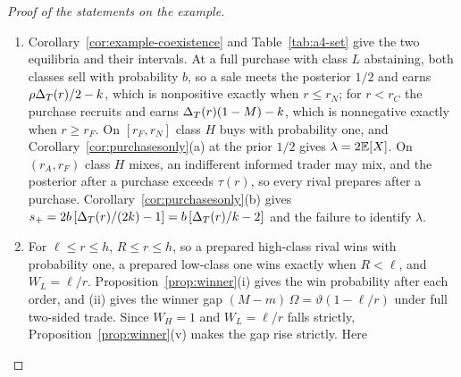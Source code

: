 \begin{proof}[Proof of the statements on the example]
\begin{enumerate}[label=(\alph*),leftmargin=2em]
recruitment at \(r_1\) is \(M'>\tau(r_1)\), and strict exclusion at \(r_2\) is \(M'<\tau(r_2)\); together they are the band.
Its left end exceeds \(3-2/v\): the inequality \(2\tau(r_1)-1>3-2/v\) is \(v<2/[4-2\tau(r_1)]=\reg{vol_band_max_frac}\),
and the example's volume lies below this bound by \(\reg{margin_vol_band_B}\). So
Proposition~\ref{prop:informedshare}(b) gives each share in the band a slot with the example's counts, and its entry
formula gives entry \(\rho+(1-\rho)v/2\) at \(r_1\) and \(\rho\) at \(r_2\), as at the example's slot, whose top
posterior lies in the band too. Such a slot has \(m'=(1-\vartheta')/2>1-\tau(r_2)\), so at \(r_1\) and at \(r_2\)
\[
\rho\,m'\,\DT(r)-k>\rho\,[1-\tau(r_2)]\,\DT(r_1)-k=\reg{margin_obs_band_incentive_B}>0,
\]
because \(\DT(r_2)>\DT(r_1)\). Proposition~\ref{prop:spread}(iv) then gives full two-sided trade as the unique outcome
of the slot at both strengths. The share \(\reg{alt_theta_B}\) lies in the band, and by
Proposition~\ref{prop:spread}(iv) its price gap at \(r_1\) is \(\rho\DT(r_1)\vartheta'+(1-\rho)\,w_{r_1}(M')\). On
\((r_S,h)\), entry after a sale and after no order is \(\rho\), and Proposition~\ref{prop:informedshare}(c) at the prior
\(1/2\) gives the share from the sale impact.
\item Corollary~\ref{cor:example-coexistence} and Table~\ref{tab:a4-set} give the two equilibria and their
intervals. At a full purchase with class \(L\) abstaining, both classes sell with probability \(b\), so a sale meets the
posterior \(1/2\) and earns \(\rho\Delta_T(r)/2-k\), which is nonpositive exactly when \(r\le r_N\); for \(r<r_C\) the purchase
recruits and earns \(\Delta_T(r)(1-M)-k\), which is nonnegative exactly when \(r\ge r_F\). On \([r_F,r_N]\) class \(H\) buys
with probability one, and Corollary~\ref{cor:purchasesonly}(a) at the prior
\(1/2\) gives \(\lambda=2\mathbb{E}[X]\). On \((r_A,r_F)\) class \(H\) mixes, an indifferent informed trader may mix, and the posterior
after a purchase exceeds \(\tau(r)\), so every rival prepares after a purchase. Corollary~\ref{cor:purchasesonly}(b)
gives \(s_+=2b\,[\Delta_T(r)/(2k)-1]=b\,[\Delta_T(r)/k-2]\) and the failure to identify \(\lambda\).
\item For \(\ell\le r\le h\), \(R\le r\le h\), so a prepared high-class rival wins with probability one, a prepared
low-class one wins exactly when \(R<\ell\), and \(W_L=\ell/r\). Proposition~\ref{prop:winner}(i) gives the win probability
after each order, and (ii) gives the winner gap \((M-m)\,\Omega=\vartheta(1-\ell/r)\) under full two-sided trade. Since
\(W_H=1\) and \(W_L=\ell/r\) falls strictly, Proposition~\ref{prop:winner}(v) makes the gap rise strictly. Here

\end{enumerate}
\end{proof}
